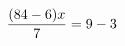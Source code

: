 \documentclass[preview]{standalone}
\begin{document}
\begin{align*}
\special{dvisvgm:raw <g id='unique000'>}\frac{(84 - 6) x}{7} = 9 - 3\special{dvisvgm:raw </g>}
\end{align*}
\end{document}
